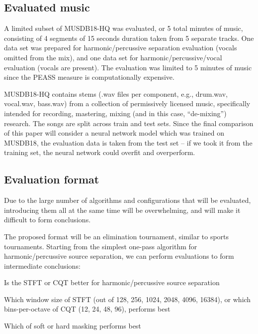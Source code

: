 \documentclass[10pt,letter]{article}
\newenvironment{tight_itemize}{
\begin{itemize}
\setlength{\itemsep}{0pt}
\setlength{\parskip}{0pt}
}{\end{itemize}}
\begin{document}
\subsection{Evaluated music}

A limited subset of MUSDB18-HQ was evaluated, or 5 total minutes of music, consisting of 4 segments of 15 seconds duration taken from 5 separate tracks. One data set was prepared for harmonic/percussive separation evaluation (vocals omitted from the mix), and one data set for harmonic/percussive/vocal evaluation (vocals are present). The evaluation was limited to 5 minutes of music since the PEASS measure is computationally expensive.

MUSDB18-HQ contains stems (.wav files per component, e.g., drum.wav, vocal.wav, bass.wav) from a collection of permissively licensed music, specifically intended for recording, mastering, mixing (and in this case, ``de-mixing'') research. The songs are split across train and test sets. Since the final comparison of this paper will consider a neural network model which was trained on MUSDB18, the evaluation data is taken from the test set -- if we took it from the training set, the neural network could overfit and overperform.

\subsection{Evaluation format}

Due to the large number of algorithms and configurations that will be evaluated, introducing them all at the same time will be overwhelming, and will make it difficult to form conclusions.

The proposed format will be an elimination tournament, similar to sports tournaments. Starting from the simplest one-pass algorithm for harmonic/percussive source separation, we can perform evaluations to form intermediate conclusions:

\begin{tight_itemize}
\vspace{-0.5em}
\item
	Is the STFT or CQT better for harmonic/percussive source separation
\item
	Which window size of STFT (out of 128, 256, 1024, 2048, 4096, 16384), or which bins-per-octave of CQT (12, 24, 48, 96), performs best
\item
	Which of soft or hard masking performs best
\end{tight_itemize} 
\end{document}
